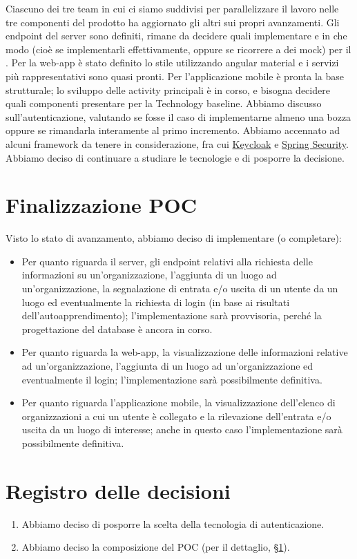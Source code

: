 \documentclass{article}
\begin{document}
Ciascuno dei tre team in cui ci siamo suddivisi per parallelizzare il lavoro nelle tre componenti del prodotto ha aggiornato gli altri sui propri avanzamenti.
Gli endpoint del server sono definiti, rimane da decidere quali implementare e in che modo (cioè se implementarli effettivamente, oppure se ricorrere a dei mock) per il \@.
Per la web-app è stato definito lo stile utilizzando angular material e i servizi più rappresentativi sono quasi pronti.
Per l'applicazione mobile è pronta la base strutturale; lo sviluppo delle activity principali è in corso, e bisogna decidere quali componenti presentare per la Technology baseline.
Abbiamo discusso sull'autenticazione, valutando se fosse il caso di implementarne almeno una bozza oppure se rimandarla interamente al primo incremento.
Abbiamo accennato ad alcuni framework da tenere in considerazione, fra cui \href{https://www.keycloak.org/}{Keycloak} e \href{https://spring.io/projects/spring-security}{Spring Security}.
Abbiamo deciso di continuare a studiare le tecnologie e di posporre la decisione.

\section{Finalizzazione POC}%
\label{sec:finalizzazione_poc}

Visto lo stato di avanzamento, abbiamo deciso di implementare (o completare):
\begin{itemize}
  \item Per quanto riguarda il server, gli endpoint relativi alla richiesta delle informazioni su un'organizzazione, l'aggiunta di un luogo ad un'organizzazione, la segnalazione di entrata e/o uscita di un utente da un luogo ed eventualmente la richiesta di login (in base ai risultati dell'autoapprendimento); l'implementazione sarà provvisoria, perché la progettazione del database è ancora in corso.
  \item Per quanto riguarda la web-app, la visualizzazione delle informazioni relative ad un'organizzazione, l'aggiunta di un luogo ad un'organizzazione ed eventualmente il login; l'implementazione sarà possibilmente definitiva.
  \item Per quanto riguarda l'applicazione mobile, la visualizzazione dell'elenco di organizzazioni a cui un utente è collegato e la rilevazione dell'entrata e/o uscita da un luogo di interesse; anche in questo caso l'implementazione sarà possibilmente definitiva.
\end{itemize}

\newpage
\section{Registro delle decisioni}%
\label{sec:registro_delle_decisioni}

\begin{enumerate}
  \item Abbiamo deciso di posporre la scelta della tecnologia di autenticazione.
  \item Abbiamo deciso la composizione del POC (per il dettaglio, §\ref{sec:finalizzazione_poc}).
\end{enumerate}

\end{document}
